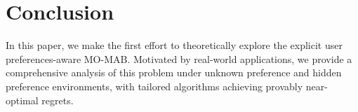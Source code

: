 \section{Conclusion}

In this paper, we make the first effort to theoretically explore the explicit user preferences-aware MO-MAB. Motivated by real-world applications, we provide a comprehensive analysis of this problem under unknown preference and hidden preference environments, with tailored algorithms achieving provably near-optimal regrets.

